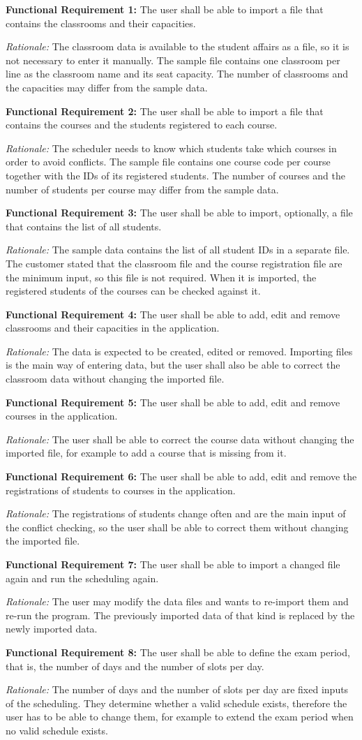 \documentclass[11pt,a4paper]{article}
\newcommand{\reqitem}[3]{\par\vspace{2pt}\noindent\textbf{#1:} #2\par\nopagebreak
  \begin{list}{}{\setlength{\leftmargin}{1.2em}\setlength{\topsep}{0pt}\setlength{\itemsep}{0pt}\setlength{\parsep}{0pt}}\item\emph{Rationale:} #3\end{list}}
\begin{document}
\reqitem{Functional Requirement 1}{The user shall be able to import a file that contains the classrooms and their capacities.}{The classroom data is available to the student affairs as a file, so it is not necessary to enter it manually. The sample file contains one classroom per line as the classroom name and its seat capacity. The number of classrooms and the capacities may differ from the sample data.}
\reqitem{Functional Requirement 2}{The user shall be able to import a file that contains the courses and the students registered to each course.}{The scheduler needs to know which students take which courses in order to avoid conflicts. The sample file contains one course code per course together with the IDs of its registered students. The number of courses and the number of students per course may differ from the sample data.}
\reqitem{Functional Requirement 3}{The user shall be able to import, optionally, a file that contains the list of all students.}{The sample data contains the list of all student IDs in a separate file. The customer stated that the classroom file and the course registration file are the minimum input, so this file is not required. When it is imported, the registered students of the courses can be checked against it.}
\reqitem{Functional Requirement 4}{The user shall be able to add, edit and remove classrooms and their capacities in the application.}{The data is expected to be created, edited or removed. Importing files is the main way of entering data, but the user shall also be able to correct the classroom data without changing the imported file.}
\reqitem{Functional Requirement 5}{The user shall be able to add, edit and remove courses in the application.}{The user shall be able to correct the course data without changing the imported file, for example to add a course that is missing from it.}
\reqitem{Functional Requirement 6}{The user shall be able to add, edit and remove the registrations of students to courses in the application.}{The registrations of students change often and are the main input of the conflict checking, so the user shall be able to correct them without changing the imported file.}
\reqitem{Functional Requirement 7}{The user shall be able to import a changed file again and run the scheduling again.}{The user may modify the data files and wants to re-import them and re-run the program. The previously imported data of that kind is replaced by the newly imported data.}
\reqitem{Functional Requirement 8}{The user shall be able to define the exam period, that is, the number of days and the number of slots per day.}{The number of days and the number of slots per day are fixed inputs of the scheduling. They determine whether a valid schedule exists, therefore the user has to be able to change them, for example to extend the exam period when no valid schedule exists.}
\end{document}
